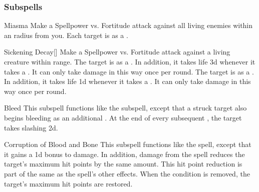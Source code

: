 \subsubsection{Subspells}


\begin{ability}[\nth{1}]{Miasma}
Make a Spellpower vs. Fortitude attack against all living enemies within an \areamed radius from you.
\hit Each target is  as a .
\end{ability}
\vspace{0.25em}


\begin{ability}[\nth{1}]{Sickening Decay}[]
Make a Spellpower vs. Fortitude attack against a living creature within \rngclose range.
\hit The target is  as a .
In addition, it takes life  \minus3d whenever it takes a .
It can only take damage in this way once per round.
\crit The target is  as a .
In addition, it takes life  \minus1d whenever it takes a .
It can only take damage in this way once per round.
\end{ability}
\vspace{0.25em}


\begin{ability}[\nth{4}]{Bleed}
This subspell functions like the  subspell, except that a struck target also begins bleeding as an additional .
At the end of every subsequent , the target takes slashing  \minus2d.
\end{ability}
\vspace{0.25em}


\begin{ability}[\nth{4}]{Corruption of Blood and Bone}
This subspell functions like the  spell, except that it gains a \plus1d bonus to damage.
In addition, damage from the spell reduces the target's maximum hit points by the same amount.
This hit point reduction is part of the same  as the spell's other effects.
When the condition is removed, the target's maximum hit points are restored.
\end{ability}
\vspace{0.25em}


